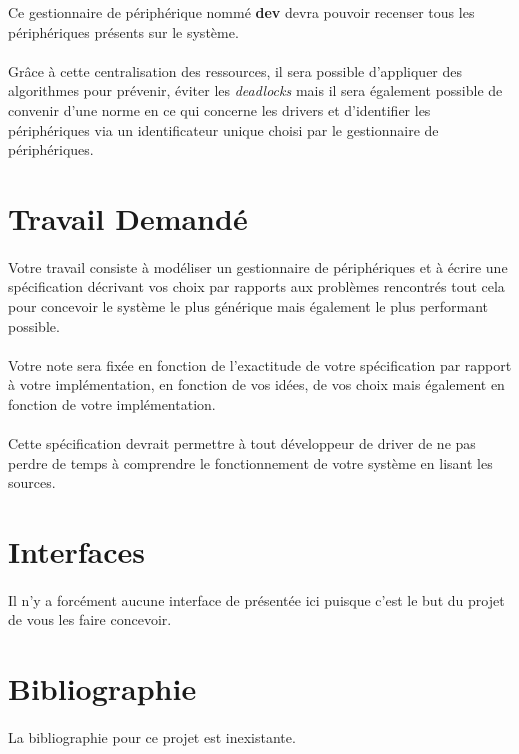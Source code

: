 \documentclass[10pt,a4wide]{article}
\begin{document}
Ce gestionnaire de p\'eriph\'erique nomm\'e \textbf{dev} devra pouvoir
recenser tous les p\'eriph\'eriques pr\'esents sur le syst\`eme.

\paragraph{}

Gr\^ace \`a cette centralisation des ressources, il sera possible d'appliquer
des algorithmes pour pr\'evenir, \'eviter les \textit{deadlocks} mais il sera
\'egalement possible de convenir d'une norme en ce qui concerne les
drivers et d'identifier les p\'eriph\'eriques via un identificateur unique
choisi par le gestionnaire de p\'eriph\'eriques.

\section{Travail Demand\'e}

\paragraph{}

Votre travail consiste \`a mod\'eliser un gestionnaire de p\'eriph\'eriques
et \`a \'ecrire une sp\'ecification d\'ecrivant vos choix par rapports
aux probl\`emes rencontr\'es tout cela pour concevoir le syst\`eme le
plus g\'en\'erique mais \'egalement le plus performant possible.

\paragraph{}

Votre note sera fix\'ee en fonction de l'exactitude de votre sp\'ecification
par rapport \`a votre impl\'ementation, en fonction de vos id\'ees, de vos
choix mais \'egalement en fonction de votre impl\'ementation.

\paragraph{}

Cette sp\'ecification devrait permettre \`a tout d\'eveloppeur de
driver de ne pas perdre de temps \`a comprendre le fonctionnement de
votre syst\`eme en lisant les sources.

\section{Interfaces}

\paragraph{}

Il n'y a forc\'ement aucune interface de pr\'esent\'ee ici puisque c'est
le but du projet de vous les faire concevoir.

\section{Bibliographie}

\paragraph{}

La bibliographie pour ce projet est inexistante.
\end{document}
